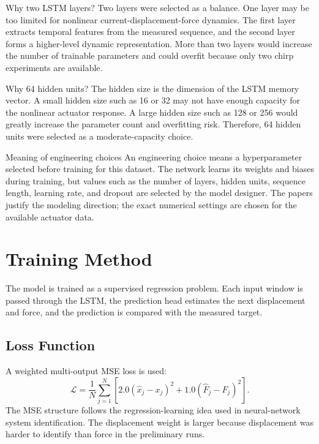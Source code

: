 \documentclass[11pt]{article}
\begin{document}
\begin{archbox}{Why two LSTM layers?}
Two layers were selected as a balance. One layer may be too limited for nonlinear current-displacement-force dynamics. The first layer extracts temporal features from the measured sequence, and the second layer forms a higher-level dynamic representation. More than two layers would increase the number of trainable parameters and could overfit because only two chirp experiments are available.
\end{archbox}

\begin{archbox}{Why 64 hidden units?}
The hidden size is the dimension of the LSTM memory vector. A small hidden size such as 16 or 32 may not have enough capacity for the nonlinear actuator response. A large hidden size such as 128 or 256 would greatly increase the parameter count and overfitting risk. Therefore, 64 hidden units were selected as a moderate-capacity choice.
\end{archbox}

\begin{summarybox}{Meaning of engineering choices}
An engineering choice means a hyperparameter selected before training for this dataset. The network learns its weights and biases during training, but values such as the number of layers, hidden units, sequence length, learning rate, and dropout are selected by the model designer. The papers justify the modeling direction; the exact numerical settings are chosen for the available actuator data.
\end{summarybox}

\section{Training Method}
The model is trained as a supervised regression problem. Each input window is passed through the LSTM, the prediction head estimates the next displacement and force, and the prediction is compared with the measured target.

\subsection{Loss Function}
A weighted multi-output MSE loss is used:
\begin{equation}
\mathcal{L}=\frac{1}{N}\sum_{j=1}^{N}\left[2.0(\hat{x}_j-x_j)^2+1.0(\hat{F}_j-F_j)^2\right].
\end{equation}
The MSE structure follows the regression-learning idea used in neural-network system identification. The displacement weight is larger because displacement was harder to identify than force in the preliminary runs.
\end{document}
